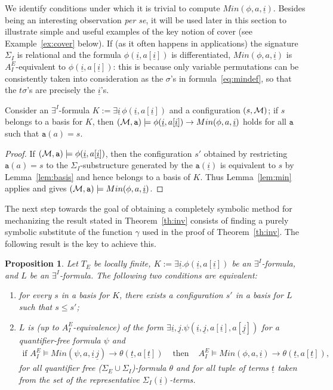 \documentclass{LMCS}
\newcommand{\ui}{\ensuremath{\underline i}}
\newcommand{\uj}{\ensuremath{\underline j}}
\newcommand{\ut}{\ensuremath{\underline t}}
\newcommand{\cM}{\ensuremath \mathcal M}
\theoremstyle{plain}\newtheorem{assumption}[thm]{Assumption}
\theoremstyle{plain}\newtheorem{proposition}[thm]{Proposition}
\theoremstyle{plain}\newtheorem{property}[thm]{Property}
\theoremstyle{plain}\newtheorem{example}[thm]{Example}
\theoremstyle{plain}\newtheorem{claim}[thm]{Claim}
\theoremstyle{plain}\newtheorem{lemma}[thm]{Lemma}
\begin{document}
\begin{rem}
  \label{rem}
We identify conditions under which it is trivial to compute
  $Min(\phi, a, \ui)$.  Besides being an interesting observation
  \emph{per se}, it will be used later in this section to illustrate
simple and useful examples of the key notion of cover (see
  Example~\ref{ex:cover} below).  If (as it often happens in
  applications) the signature $\Sigma_I$ is relational and the formula
  $\phi(\ui, a[\ui])$ is differentiated, $Min(\phi, a, \ui)$ is
  $A^E_I$-equivalent to $\phi(\ui, a[\ui])$: this is because only
  variable permutations can be consistently taken into consideration
  as the $\sigma$'s in formula~\eqref{eq:mindef}, so that the
  $t\sigma$'s are precisely the $\ui$'s.
\end{rem}
\begin{cor}
  \label{coro:min}
  Consider an $\exists^I$-formula $K:= \exists\ui\, \phi(\ui, a[\ui])$
  and a configuration $(s,\cM)$; if $s$ belongs to a basis for $K$,
  then $(\cM, \mathtt{a})\models \phi(\ui, a[\ui])\to Min(\phi, a,
  \ui)$ holds for all $\mathtt{a}$ such that $\mathtt{a}(a)=s$.
\end{cor}
\begin{proof}
  If $(\cM, \mathtt{a})\models \phi(\ui, a[\ui])$, then the
  configuration $s'$ obtained by restricting $\mathtt{a}(a)=s$ to the
  $\Sigma_I$-substructure generated by the $\mathtt{a}(\ui)$ is
  equivalent to $s$ by Lemma~\ref{lem:basis} and hence belongs to a
  basis of $K$.  Thus Lemma~\ref{lem:min} applies and gives $(\cM,
  \mathtt{a})\models Min(\phi, a, \ui)$.
\end{proof}
The next step towards the goal of obtaining a completely symbolic
method for mechanizing the result stated in Theorem~\ref{th:inv}
consists of finding a purely symbolic substitute
of the function $\gamma$ used in the proof of Theorem~\ref{th:inv}.
The following result is the key to achieve this.
\begin{proposition}
  \label{prop:sintsem}
  Let $T_E$ be locally finite, $K:= \exists \ui.\phi(\ui, a[\ui])$ be
  an $\exists^I$-formula, and $L$ be an $\exists^I$-formula. The
  following two conditions are equivalent:
  \begin{enumerate}[{\rm (i)}]
  \item for every $s$ in
a basis for $K$, there exists a configuration $s'$ in a basis for
    $L$ such that $s\leq s'$;
  \item $L$ is (up to $A^E_I$-equivalence) of the form $\exists\ui,
    \uj.\psi(\ui, \uj, a[\ui], a[\uj])$ for a quantifier-free formula
    $\psi$ and
    \begin{eqnarray*}
      \mbox{if }
      A^E_I\models Min(\psi,a, \ui\,\uj)\to \theta(\ut, a[\ut])
      & \mbox{ then } &
      A^E_I\models Min(\phi,a,\ui)\to \theta(\ut, a[\ut]) ,
    \end{eqnarray*}
    for all quantifier free ($\Sigma_E\cup \Sigma_I$)-formula
    $\theta$ and for all tuple of terms $\ut$ taken from the set
    of the representative $\Sigma_I(\ui)$-terms.
 \end{enumerate}
\end{proposition}
\end{document}
